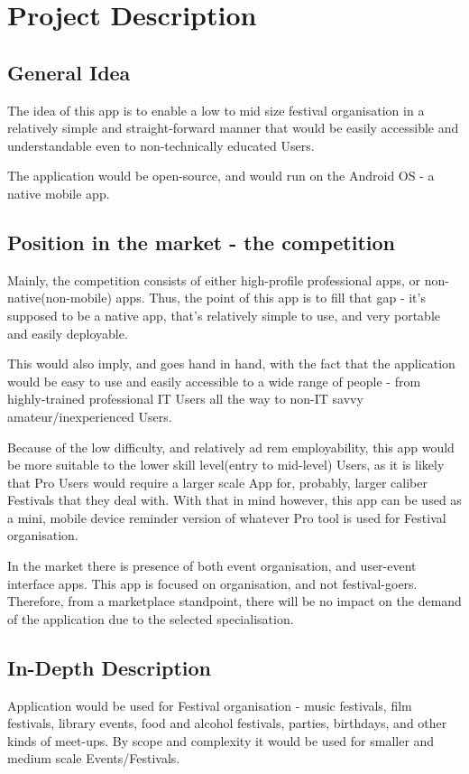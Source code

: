 \chapter{Project Description}

\section{General Idea}
The idea of this app is to enable a low to mid size festival organisation in a relatively simple and straight-forward manner that would be easily accessible and understandable even to non-technically educated Users.

The application would be open-source, and would run on the Android OS - a native mobile app.

\section{Position in the market - the competition}

Mainly, the competition consists of either high-profile professional apps, or non-native(non-mobile) apps. Thus, the point of this app is to fill that gap - it's supposed to be a native app, that's relatively simple to use, and very portable and easily deployable.

This would also imply, and goes hand in hand, with the fact that the application would be easy to use and easily accessible to a wide range of people - from highly-trained professional IT Users all the way to non-IT savvy amateur/inexperienced Users.

Because of the low difficulty, and relatively ad rem employability, this app would be more suitable to the lower skill level(entry to mid-level) Users, as it is likely that Pro Users would require a larger scale App for, probably, larger caliber Festivals that they deal with. With that in mind however, this app can be used as a mini, mobile device reminder version of whatever Pro tool is used for Festival organisation.

In the market there is presence of both event organisation, and user-event interface apps. This app is focused on organisation, and not festival-goers. Therefore, from a marketplace standpoint, there will be no impact on the demand of the application due to the selected specialisation.

\section{In-Depth Description}
Application would be used for Festival organisation - music festivals, film festivals, library events, food and alcohol festivals, parties, birthdays, and other kinds of meet-ups. By scope and complexity it would be used for smaller and medium scale Events/Festivals.

